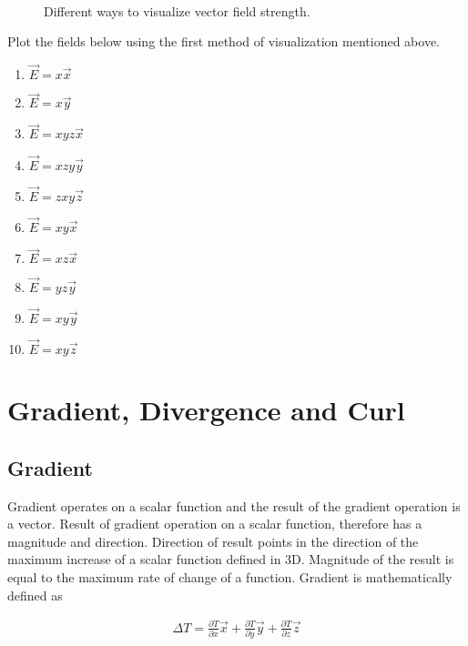 \begin{figure}[htbp]
\begin{center}
\strut{} \\
\end{center}
\caption{Different ways to visualize vector field strength.}
\label{visual}
\end{figure}


Plot the fields below using the first method of visualization mentioned above.
\begin{enumerate}
\item $\vec{E} = x \vec{x} $
\item $\vec{E} = x \vec{y} $
\item $\vec{E} = xyz \vec{x} $
\item $\vec{E} = xzy \vec{y} $
\item $\vec{E} = zxy \vec{z} $
\item $\vec{E} = xy \vec{x} $
\item $\vec{E} = xz \vec{x} $
\item $\vec{E} = yz \vec{y} $
\item $\vec{E} = xy \vec{y} $
\item $\vec{E} = xy \vec{z} $
\end{enumerate}



\section{Gradient, Divergence and Curl}


\subsection{Gradient}

Gradient operates on a scalar function and the result of the gradient operation is a vector. Result of gradient operation on  a scalar function, therefore has a magnitude and direction. Direction of result points in the direction of the maximum increase of a scalar function defined in 3D. Magnitude of the result is equal to the maximum rate of change of a function. 
Gradient is mathematically defined as

\begin{eqnarray}
\Delta T = \frac{\partial T}{\partial x} \vec{x} +\frac{\partial T}{\partial y} \vec{y} +\frac{\partial T}{\partial z} \vec{z} \\ \nonumber
\end{eqnarray}






